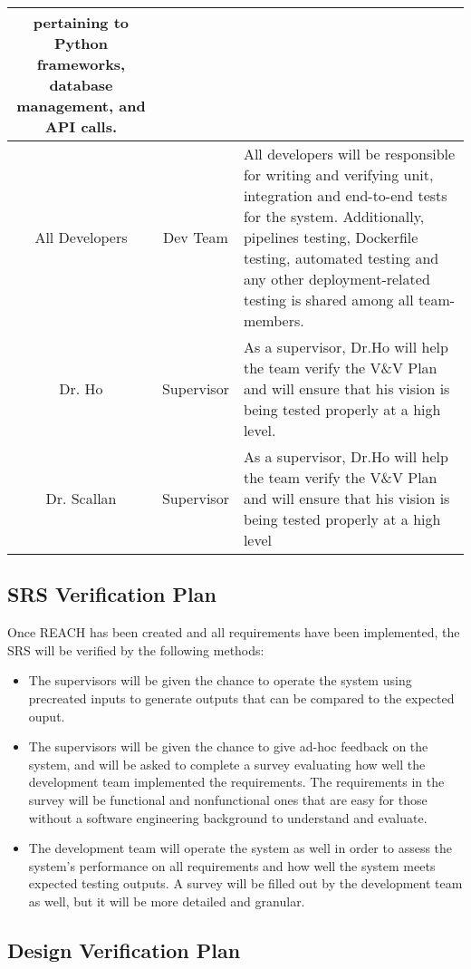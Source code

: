 \documentclass[12pt, titlepage]{article}
\begin{document}
\begin{table}[H]
\begin{tabular}{|c|c|p{10cm}|}
        pertaining to Python frameworks, database management, and API calls. \\
        \hline
        All Developers & Dev Team & All developers will be responsible for writing and verifying unit, integration and 
        end-to-end tests for the system. Additionally, pipelines testing, Dockerfile testing, automated testing and any 
        other deployment-related testing is shared among all team-members.\\
        \hline
        Dr. Ho & Supervisor & As a supervisor, Dr.Ho will help the team verify the V\&V Plan and will ensure that 
        his vision is being tested properly at a high level.\\
        \hline
        Dr. Scallan & Supervisor & As a supervisor, Dr.Ho will help the team verify the V\&V Plan and will 
        ensure that his vision is being tested properly at a high level \\       
        \hline
    \end{tabular}
\end{table}

\subsection{SRS Verification Plan}

Once REACH has been created and all requirements have been implemented, 
the SRS will be verified by the following methods:
\begin{itemize}
  \item The supervisors will be given the chance to operate the system using 
  precreated inputs to generate outputs that can be compared to the expected ouput. 
  \item The supervisors will be given the chance to give 
  ad-hoc feedback on the system, and will be asked to complete a survey evaluating how
  well the development team implemented the requirements. 
  The requirements in the survey will be functional and nonfunctional ones that are easy 
  for those without a software engineering background to understand and evaluate.

  \item The development team will operate the system as well in order to assess the system's
  performance on all requirements and how well the system meets expected testing outputs.
  A survey will be filled out by the development team as well, 
  but it will be more detailed and granular.
\end{itemize}
\subsection{Design Verification Plan}
\end{document}

